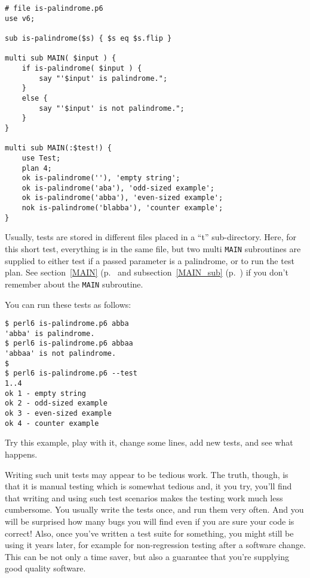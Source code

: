 \begin{verbatim}
# file is-palindrome.p6
use v6;

sub is-palindrome($s) { $s eq $s.flip }

multi sub MAIN( $input ) {
    if is-palindrome( $input ) {
        say "'$input' is palindrome.";
    }
    else {
        say "'$input' is not palindrome.";
    }
}

multi sub MAIN(:$test!) {
    use Test;
    plan 4;
    ok is-palindrome(''), 'empty string';
    ok is-palindrome('aba'), 'odd-sized example';
    ok is-palindrome('abba'), 'even-sized example';
    nok is-palindrome('blabba'), 'counter example';
}
\end{verbatim}

Usually, tests are stored in different files placed in a ``t'' 
sub-directory. Here, for this short test, everything is in the 
same file, but two multi {\tt MAIN} subroutines are supplied 
to either test if a passed parameter is a palindrome, or to 
run the test plan. See section~\ref{MAIN} (p.~\pageref{MAIN} and 
subsection~\ref{MAIN_sub} (p.~\pageref{MAIN_sub}) if you don't 
remember about the {\tt MAIN} subroutine.

You can run these tests as follows:

\begin{verbatim}
$ perl6 is-palindrome.p6 abba
'abba' is palindrome.
$ perl6 is-palindrome.p6 abbaa
'abbaa' is not palindrome.
$
$ perl6 is-palindrome.p6 --test
1..4
ok 1 - empty string
ok 2 - odd-sized example
ok 3 - even-sized example
ok 4 - counter example
\end{verbatim}

Try this example, play with it, change some lines, add 
new tests, and see what happens.

Writing such unit tests may appear to be tedious work. 
The truth, though, is that it is manual testing which is 
somewhat tedious and, it you try, you'll find that 
writing and using such test scenarios makes the testing 
work much less cumbersome. You usually write the tests 
once, and run them very often. And you will be surprised 
how many bugs you will find even if you are sure your 
code is correct! Also, once you've written 
a test suite for something, you might still be using it 
years later, for example for non-regression testing after 
a software change. This can be not only a time saver, but 
also a guarantee that you're supplying good quality software.

